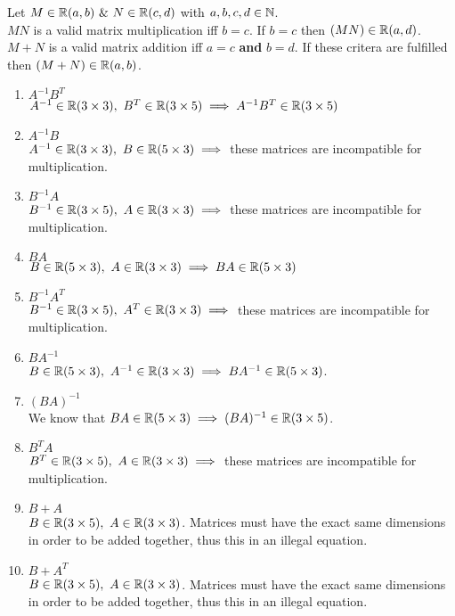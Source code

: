 \documentclass[11pt,a4paper]{article}
\begin{document}
\apart
Let $M\in\reals(a,b)\ \&\ N\in\reals(c,d)$ with $a,b,c,d\in\mathbb{N}$.\\
$MN$ is a valid matrix multiplication iff $b=c$. If $b=c$ then $(MN)\in\mathbb{R}(a,d)$.\\
$M+N$ is a valid matrix addition iff $a=c$ \textbf{and} $b=d$. If these critera are fulfilled then $(M+N)\in\mathbb{R}(a,b)$.
\begin{enumerate}[label=\roman*)]
	\item $A^{-1}B^T$\\
	$A^{-1}\in\reals(3\times3),\ B^T\in\reals(3\times5)\implies A^{-1}B^T\in\reals(3\times5)$
	\item $A^{-1}B$\\
	$A^{-1}\in\reals(3\times3),\ B\in\reals(5\times3)\implies$ these matrices are incompatible for multiplication.
	\item $B^{-1}A$\\
	$B^{-1}\in\reals(3\times5),\ A\in\reals(3\times3)\implies$ these matrices are incompatible for multiplication.
	\item $BA$\\
	$B\in\reals(5\times3),\ A\in\reals(3\times3)\implies BA\in\reals(5\times3)$
	\item $B^{-1}A^T$\\
	$B^{-1}\in\reals(3\times5),\ A^T\in\reals(3\times3)\implies$ these matrices are incompatible for multiplication.
	\item $BA^{-1}$\\
	$B\in\reals(5\times3),\ A^{-1}\in\reals(3\times3)\implies BA^{-1}\in\reals(5\times3)$.
	\item $(BA)^{-1}$\\
	We know that $BA\in\mathbb{R}(5\times3)\implies(BA)^{-1}\in\mathbb{R}(3\times5)$.
	\item $B^TA$\\
	$B^T\in\reals(3\times5),\ A\in\reals(3\times3)\implies$ these matrices are incompatible for multiplication.
	\item $B+A$\\
	$B\in\reals(3\times5),\ A\in\reals(3\times3)$. Matrices must have the exact same dimensions in order to be added together, thus this in an illegal equation.
	\item $B+A^T$\\
	$B\in\reals(3\times5),\ A\in\reals(3\times3)$. Matrices must have the exact same dimensions in order to be added together, thus this in an illegal equation.
\end{enumerate}
\end{document}
